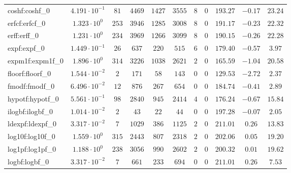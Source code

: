 \begin{tabular}{|l|c|c|c|c|c|c|c|c|c|c|}
coshf:coshf\_0               & $ 4.191 \cdot 10^{-1} $ & $ 81     $ & $ 4469  $ & $ 1427  $ & $ 3555  $ & $ 8   $ & $ 0 $ & $ 193.27      $ & $ -0.17   $ & $ 23.24   $ \\
erfcf:erfcf\_0               & $ 1.323 \cdot 10^{0}  $ & $ 253    $ & $ 3946  $ & $ 1285  $ & $ 3008  $ & $ 8   $ & $ 0 $ & $ 191.17      $ & $ -0.23   $ & $ 22.32   $ \\
erff:erff\_0                 & $ 1.231 \cdot 10^{0}  $ & $ 234    $ & $ 3969  $ & $ 1266  $ & $ 3099  $ & $ 8   $ & $ 0 $ & $ 190.15      $ & $ -0.26   $ & $ 22.28   $ \\
expf:expf\_0                 & $ 1.449 \cdot 10^{-1} $ & $ 26     $ & $ 637   $ & $ 220   $ & $ 515   $ & $ 6   $ & $ 0 $ & $ 179.40      $ & $ -0.57   $ & $ 3.97    $ \\
expm1f:expm1f\_0             & $ 1.896 \cdot 10^{0}  $ & $ 314    $ & $ 3226  $ & $ 1038  $ & $ 2621  $ & $ 2   $ & $ 0 $ & $ 165.59      $ & $ -1.04   $ & $ 20.58   $ \\
floorf:floorf\_0             & $ 1.544 \cdot 10^{-2} $ & $ 2      $ & $ 171   $ & $ 58    $ & $ 143   $ & $ 0   $ & $ 0 $ & $ 129.53      $ & $ -2.72   $ & $ 2.37    $ \\
fmodf:fmodf\_0               & $ 6.496 \cdot 10^{-2} $ & $ 12     $ & $ 876   $ & $ 267   $ & $ 654   $ & $ 0   $ & $ 0 $ & $ 184.74      $ & $ -0.41   $ & $ 2.89    $ \\
hypotf:hypotf\_0             & $ 5.561 \cdot 10^{-1} $ & $ 98     $ & $ 2840  $ & $ 945   $ & $ 2414  $ & $ 4   $ & $ 0 $ & $ 176.24      $ & $ -0.67   $ & $ 15.84   $ \\
ilogbf:ilogbf\_0             & $ 1.014 \cdot 10^{-2} $ & $ 2      $ & $ 43    $ & $ 22    $ & $ 44    $ & $ 0   $ & $ 0 $ & $ 197.28      $ & $ -0.07   $ & $ 2.05    $ \\
ldexpf:ldexpf\_0             & $ 3.317 \cdot 10^{-2} $ & $ 7      $ & $ 1029  $ & $ 386   $ & $ 1125  $ & $ 2   $ & $ 0 $ & $ 211.01      $ & $ 0.26    $ & $ 13.83   $ \\
log10f:log10f\_0             & $ 1.559 \cdot 10^{0}  $ & $ 315    $ & $ 2443  $ & $ 807   $ & $ 2318  $ & $ 2   $ & $ 0 $ & $ 202.06      $ & $ 0.05    $ & $ 19.20   $ \\
log1pf:log1pf\_0             & $ 1.188 \cdot 10^{0}  $ & $ 238    $ & $ 3056  $ & $ 990   $ & $ 2602  $ & $ 2   $ & $ 0 $ & $ 200.32      $ & $ 0.01    $ & $ 19.62   $ \\
logbf:logbf\_0               & $ 3.317 \cdot 10^{-2} $ & $ 7      $ & $ 661   $ & $ 233   $ & $ 694   $ & $ 0   $ & $ 0 $ & $ 211.01      $ & $ 0.26    $ & $ 7.53    $ \\

\end{tabular}
